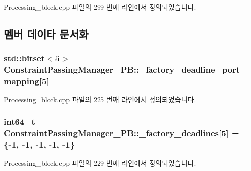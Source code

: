 Processing\+\_\+block.\+cpp 파일의 299 번째 라인에서 정의되었습니다.



\subsection{멤버 데이타 문서화}
\subsubsection[{\texorpdfstring{\+\_\+factory\+\_\+deadline\+\_\+port\+\_\+mapping}{_factory_deadline_port_mapping}}]{\setlength{\rightskip}{0pt plus 5cm}std\+::bitset$<$5$>$ Constraint\+Passing\+Manager\+\_\+\+P\+B\+::\+\_\+factory\+\_\+deadline\+\_\+port\+\_\+mapping\mbox{[}5\mbox{]}\hspace{0.3cm}{\ttfamily [private]}}\hypertarget{classConstraintPassingManager__PB_ac9c7c8ece56f6b66647da4793fdbcdd5}{}\label{classConstraintPassingManager__PB_ac9c7c8ece56f6b66647da4793fdbcdd5}


Processing\+\_\+block.\+cpp 파일의 225 번째 라인에서 정의되었습니다.

\subsubsection[{\texorpdfstring{\+\_\+factory\+\_\+deadlines}{_factory_deadlines}}]{\setlength{\rightskip}{0pt plus 5cm}int64\+\_\+t Constraint\+Passing\+Manager\+\_\+\+P\+B\+::\+\_\+factory\+\_\+deadlines\mbox{[}5\mbox{]} = \{-\/1, -\/1, -\/1, -\/1, -\/1\}\hspace{0.3cm}{\ttfamily [private]}}\hypertarget{classConstraintPassingManager__PB_a1a7e67da1e921de5f66eb9bf676ea945}{}\label{classConstraintPassingManager__PB_a1a7e67da1e921de5f66eb9bf676ea945}


Processing\+\_\+block.\+cpp 파일의 229 번째 라인에서 정의되었습니다.

